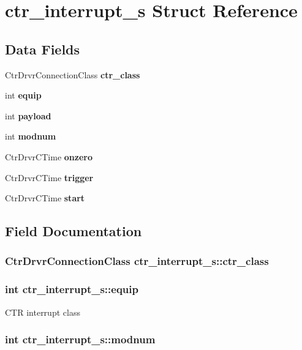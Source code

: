 \section{ctr\_\-interrupt\_\-s Struct Reference}
\label{structctr__interrupt__s}
\subsection*{Data Fields}
\begin{CompactItemize}
\item 
Ctr\-Drvr\-Connection\-Class \bf{ctr\_\-class}
\item 
int \bf{equip}
\item 
int \bf{payload}
\item 
int \bf{modnum}
\item 
Ctr\-Drvr\-CTime \bf{onzero}
\item 
Ctr\-Drvr\-CTime \bf{trigger}
\item 
Ctr\-Drvr\-CTime \bf{start}
\end{CompactItemize}


\subsection{Field Documentation}
\subsubsection{\setlength{\rightskip}{0pt plus 5cm}Ctr\-Drvr\-Connection\-Class \bf{ctr\_\-interrupt\_\-s::ctr\_\-class}}\label{structctr__interrupt__s_e6685d8bb237190a5aa4e118e46ebd33}


\subsubsection{\setlength{\rightskip}{0pt plus 5cm}int \bf{ctr\_\-interrupt\_\-s::equip}}\label{structctr__interrupt__s_e7b80dc8e0a5aeb2b65bd35e9c0daea0}


CTR interrupt class 
\subsubsection{\setlength{\rightskip}{0pt plus 5cm}int \bf{ctr\_\-interrupt\_\-s::modnum}}\label{structctr__interrupt__s_cb6824806168b83700f9e7fb3ce6862f}


